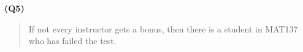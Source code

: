 \documentclass[12pt, letterpaper]{article}
\begin{document}
\textbf{(Q5)}

\begin{quote}
    If not every instructor gets a bonus, then there is a student in MAT137 who has failed the test.
\end{quote}
\end{document}
